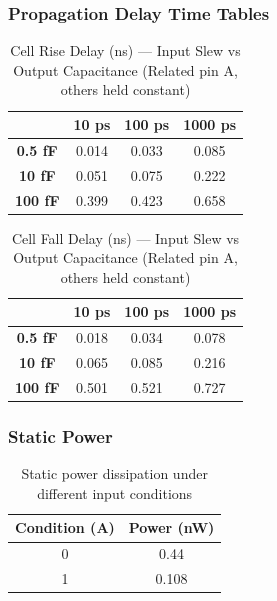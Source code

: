 \documentclass[12pt]{article}
\begin{document}
\subsubsection{Propagation Delay Time Tables}

\begin{table}[H]
	\centering
	\begin{tabular}{|c|c|c|c|}
		\hline
		                & \textbf{10 ps} & \textbf{100 ps} & \textbf{1000 ps} \\
		\hline
		\textbf{0.5 fF} & 0.014          & 0.033           & 0.085            \\
		\hline
		\textbf{10 fF}  & 0.051          & 0.075           & 0.222            \\
		\hline
		\textbf{100 fF} & 0.399          & 0.423           & 0.658            \\
		\hline
	\end{tabular}
	\caption{Cell Rise Delay (ns) — Input Slew vs Output Capacitance (Related pin A, others held constant)}
\end{table}

\begin{table}[H]
	\centering
	\begin{tabular}{|c|c|c|c|}
		\hline
		                & \textbf{10 ps} & \textbf{100 ps} & \textbf{1000 ps} \\
		\hline
		\textbf{0.5 fF} & 0.018          & 0.034           & 0.078            \\
		\hline
		\textbf{10 fF}  & 0.065          & 0.085           & 0.216            \\
		\hline
		\textbf{100 fF} & 0.501          & 0.521           & 0.727            \\
		\hline
	\end{tabular}
	\caption{Cell Fall Delay (ns) — Input Slew vs Output Capacitance (Related pin A, others held constant)}
\end{table}

\subsubsection{Static Power}

\begin{table}[H]
	\centering
	\begin{tabular}{|c|c|}
		\hline
		\textbf{Condition (A)} & \textbf{Power (nW)} \\
		\hline
		0                      & 0.44                \\
		\hline
		1                      & 0.108               \\
		\hline
	\end{tabular}
	\caption{Static power dissipation under different input conditions}
\end{table}
\end{document}
